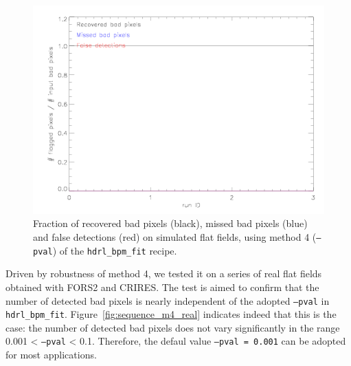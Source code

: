 \begin{figure}
 \subfigure
\includegraphics[width=15cm]{figures/results_4.png}
 \caption{Fraction of recovered bad pixels (black), missed bad pixels
   (blue) and false detections (red) on simulated flat fields, using
   method 4 ({\tt --pval}) of the {\tt hdrl\_bpm\_fit} recipe.}
 \label{fig:sequence_m4}
\end{figure}


Driven by robustness of method 4, we tested it on a series of real
flat fields obtained with FORS2 and CRIRES. The test is aimed to
confirm that the number of detected bad pixels is nearly independent
of the adopted {\tt --pval} in {\tt hdrl\_bpm\_fit}. Figure~\ref{fig:sequence_m4_real} indicates indeed
that this is the case: the number of detected bad pixels does not vary
significantly in the range 0.001 < {\tt --pval} < 0.1. Therefore, the defaul
value {\tt --pval = 0.001} can be adopted for most applications.

